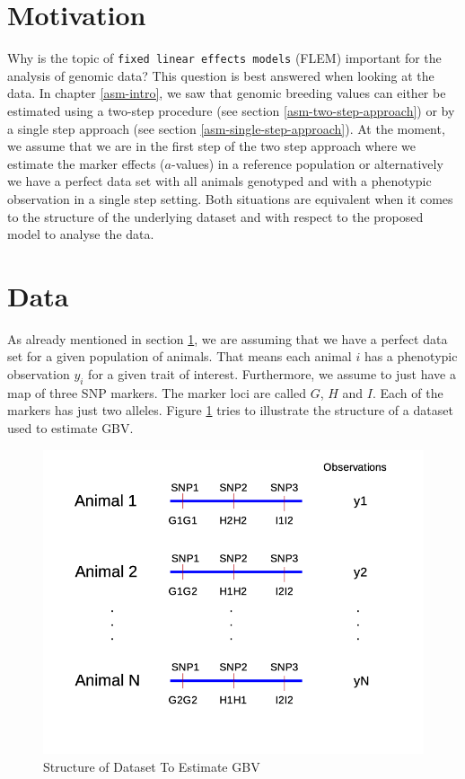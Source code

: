 \documentclass[]{book}
\theoremstyle{definition}
\theoremstyle{definition}
\theoremstyle{definition}
\theoremstyle{remark}
\begin{document}
\hypertarget{asm-flem-motivation}{%
\section{Motivation}\label{asm-flem-motivation}}

Why is the topic of \texttt{fixed\ linear\ effects\ models} (FLEM) important for the analysis of genomic data? This question is best answered when looking at the data. In chapter \ref{asm-intro}, we saw that genomic breeding values can either be estimated using a two-step procedure (see section \ref{asm-two-step-approach}) or by a single step approach (see section \ref{asm-single-step-approach}). At the moment, we assume that we are in the first step of the two step approach where we estimate the marker effects (\(a\)-values) in a reference population or alternatively we have a perfect data set with all animals genotyped and with a phenotypic observation in a single step setting. Both situations are equivalent when it comes to the structure of the underlying dataset and with respect to the proposed model to analyse the data.

\hypertarget{asm-flem-data}{%
\section{Data}\label{asm-flem-data}}

As already mentioned in section \ref{asm-flem-motivation}, we are assuming that we have a perfect data set for a given population of animals. That means each animal \(i\) has a phenotypic observation \(y_i\) for a given trait of interest. Furthermore, we assume to just have a map of three SNP markers. The marker loci are called \(G\), \(H\) and \(I\). Each of the markers has just two alleles. Figure \ref{fig:datastucturegbv} tries to illustrate the structure of a dataset used to estimate GBV.

\begin{figure}
\centering
\includegraphics{odg/datastucturegbv.png}
\caption{\label{fig:datastucturegbv}Structure of Dataset To Estimate GBV}
\end{figure}
\end{document}
